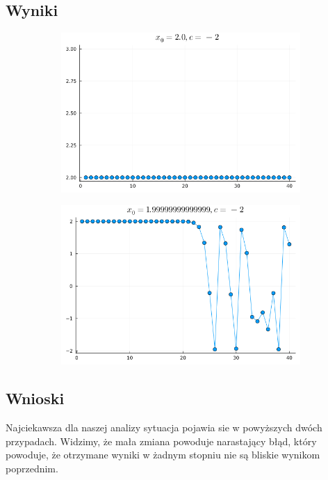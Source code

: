 \documentclass{article}
\def\v{0.47}
\begin{document}
\subsection*{Wyniki}
	\begin{figure}[H]
		\centering
		\begin{subfigure}[b]{\v\linewidth}
			\includegraphics[width=\linewidth]{graphs/2.png}
		\end{subfigure}
		\begin{subfigure}[b]{\v\linewidth}
			\includegraphics[width=\linewidth]{graphs/3.png}
		\end{subfigure}
	\end{figure}
\subsection*{Wnioski}
	Najciekawsza dla naszej analizy sytuacja pojawia sie w powyższych dwóch przypadach. Widzimy, że mała zmiana powoduje narastający błąd, który powoduje,
	że otrzymane wyniki w żadnym stopniu nie są bliskie wynikom poprzednim.
\end{document}
